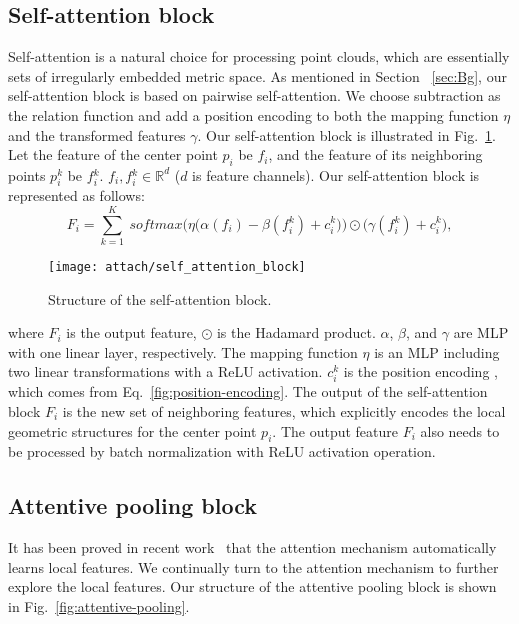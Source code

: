 \documentclass[review]{elsarticle}
\begin{document}
\subsection{\textbf{Self-attention block}} \label{sec:TB}
Self-attention is a natural choice for processing point clouds, which are essentially sets of irregularly embedded metric space. As mentioned in Section ~\ref{sec:Bg}, our self-attention block is based on pairwise self-attention. We choose subtraction as the relation function and add a position encoding to both the mapping function $\eta$ and the transformed features $\gamma$. Our self-attention block is illustrated in Fig.~\ref{fig:transformer-block}. Let the feature of the center point  ${p_i}$ be ${f_i}$, and the feature of its neighboring points $p{}^k_i$ be $f{}^k_i$. ${f_i},f{}^k_i \in  \mathbb{R}^{d}$ ($d$ is feature channels). Our self-attention block is represented as follows:
\begin{equation}
	\label{eq:tb}
	   F_i = \sum\limits_{k=1}^{K} \ softmax\Big(\eta\big(\alpha(f_i)-\beta(f{}^k_i)+c{}^k_i\big)\Big) \odot \big(\gamma(f{}^k_i)+c{}^k_i\big),
\end{equation}

\begin{figure}[!t]
	\centering
	\texttt{[image: attach/self\_attention\_block]}
	\caption{Structure of the self-attention block.}
	\label{fig:transformer-block}
\end{figure}

\noindent where $F_i$ is the output feature, $\odot$ is the Hadamard product. $\alpha$, $\beta$, and $\gamma$ are MLP with one linear layer, respectively. The mapping function $\eta$ is an MLP including two linear transformations with a ReLU activation. $c{}^k_i$ is the position encoding , which comes from Eq.~\ref{fig:position-encoding}. The output of the self-attention block $F_i$ is the new set of neighboring features, which explicitly encodes the local geometric structures for the center point $p_i$. The output feature $F_i$ also needs to be processed by batch normalization with ReLU activation operation.

\subsection{\textbf{Attentive pooling block}}

It has been proved in recent work~\cite{yang2020robust} that the attention mechanism automatically learns local features. We continually turn to the attention mechanism to further explore the local features. Our structure of the attentive pooling block is shown in Fig.~\ref{fig:attentive-pooling}.
\end{document}
